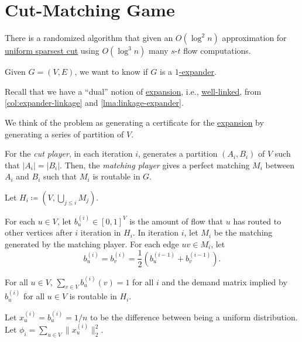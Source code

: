 \section{Cut-Matching Game}
\begin{theorem}
	There is a randomized algorithm that given an \(O(\log ^2 n)\) approximation for \hyperref[prb:sparsest-cut]{uniform sparsest cut} using \(O(\log ^3 n)\) many \(s\)-\(t\) flow computations.
\end{theorem}

\begin{problem*}
	Given \(G = (V, E)\), we want to know if \(G\) is a \hyperref[def:expander]{\(1\)-expander}.
\end{problem*}

Recall that we have a ``dual'' notion of \hyperref[def:expansion]{expansion}, i.e., \hyperref[def:linkage]{well-linked}, from \autoref{col:expander-linkage} and \autoref{lma:linkage-expander}.

\begin{intuition}
	We think of the problem as generating a certificate for the \hyperref[def:expansion]{expansion} by generating a series of partition of \(V\).
\end{intuition}

For the \emph{cut player}, in each iteration \(i\), generates a partition \((A_i, B_i)\) of \(V\) such that \(\lvert A_i \rvert = \lvert B_i \rvert \). Then, the \emph{matching player} gives a perfect matching \(M_i\) between \(A_i\) and \(B_i\) such that \(M_i\) is routable in \(G\).

Let \(H_i \coloneqq (V, \bigcup_{j \leq i} M_j)\).

For each \(u \in V\), let \(b_u^{(i)} \in [0, 1]^V\) is the amount of flow that \(u\) has routed to other vertices after \(i\) iteration in \(H_i\). In iteration \(i\), let \(M_i\) be  the matching generated by the matching player. For each edge \(uv \in M_i\), let
\[
	b_u^{(i)}
	= b_v^{(i)}
	= \frac{1}{2} (b_u^{(i-1)} + b_v^{(i-1)}).
\]

\begin{claim}
	For all \(u \in V\), \(\sum_{v \in V} b_u^{(i)}(v) = 1\) for all \(i\) and the demand matrix implied by \(b_u^{(i)}\) for all \(u \in V\) is routable in \(H_i\).
\end{claim}

Let \(x_u^{(i)} = b_u^{(i)} = 1 / n\) to be the difference between being a uniform distribution. Let \(\phi _i = \sum_{u \in V} \lVert x_u^{(i)} \rVert _2^2\).

